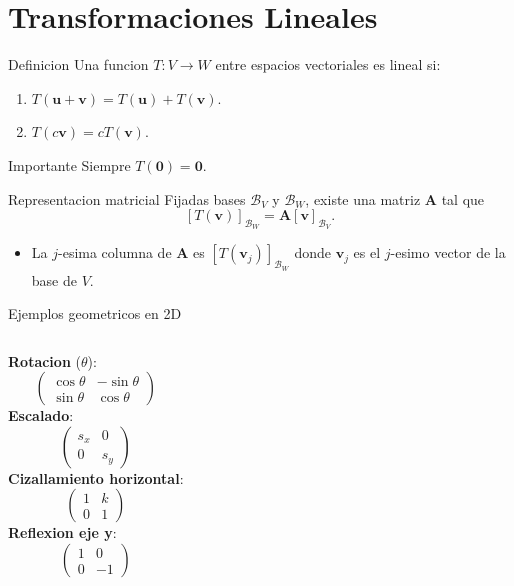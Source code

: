 \documentclass[aspectratio=169, 10pt, xcolor=table]{beamer}
\begin{document}
\section{Transformaciones Lineales}

\begin{frame}{Definicion}
    Una funcion $T:V\to W$ entre espacios vectoriales es lineal si:
    \begin{enumerate}
        \item $T(\mathbf{u}+\mathbf{v}) = T(\mathbf{u}) + T(\mathbf{v})$.
        \item $T(c\mathbf{v}) = cT(\mathbf{v})$.
    \end{enumerate}
    \begin{alertblock}{Importante}
        Siempre $T(\mathbf{0}) = \mathbf{0}$.
    \end{alertblock}
\end{frame}

\begin{frame}{Representacion matricial}
    Fijadas bases $\mathcal{B}_V$ y $\mathcal{B}_W$, existe una matriz $\mathbf{A}$ tal que
    \[
    [T(\mathbf{v})]_{\mathcal{B}_W} = \mathbf{A} [\mathbf{v}]_{\mathcal{B}_V}.
    \]
    \begin{itemize}
        \item La $j$-esima columna de $\mathbf{A}$ es $[T(\mathbf{v}_j)]_{\mathcal{B}_W}$ donde $\mathbf{v}_j$ es el $j$-esimo vector de la base de $V$.
    \end{itemize}
\end{frame}

\begin{frame}{Ejemplos geometricos en 2D}
    \begin{columns}[t]
        \textbf{Rotacion} ($\theta$):
        \[
        \begin{pmatrix}\cos\theta & -\sin\theta\\ \sin\theta & \cos\theta\end{pmatrix}
        \]
        \textbf{Escalado}:
        \[
        \begin{pmatrix}s_x & 0\\ 0 & s_y\end{pmatrix}
        \]
        \textbf{Cizallamiento horizontal}:
        \[
        \begin{pmatrix}1 & k\\ 0 & 1\end{pmatrix}
        \]
        \textbf{Reflexion eje y}:
        \[
        \begin{pmatrix}1 & 0\\ 0 & -1\end{pmatrix}
        \]
    \end{columns}
\end{frame}
\end{document}
